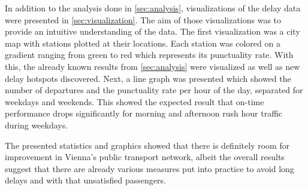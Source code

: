 In addition to the analysis done in \cref{sec:analysis}, visualizations of the delay data were presented in \cref{sec:visualization}. The aim of those visualizations was to provide an intuitive understanding of the data. The first visualization was a city map with stations plotted at their locations. Each station was colored on a gradient ranging from green to red which represents its punctuality rate. With this, the already known results from \cref{sec:analysis} were visualized as well as new delay hotspots discovered. Next, a line graph was presented which showed the number of departures and the punctuality rate per hour of the day, separated for weekdays and weekends. This showed the expected result that on-time performance drops significantly for morning and afternoon rush hour traffic during weekdays.

The presented statistics and graphics showed that there is definitely room for improvement in Vienna's public transport network, albeit the overall results suggest that there are already various measures put into practice to avoid long delays and with that unsatisfied passengers.


